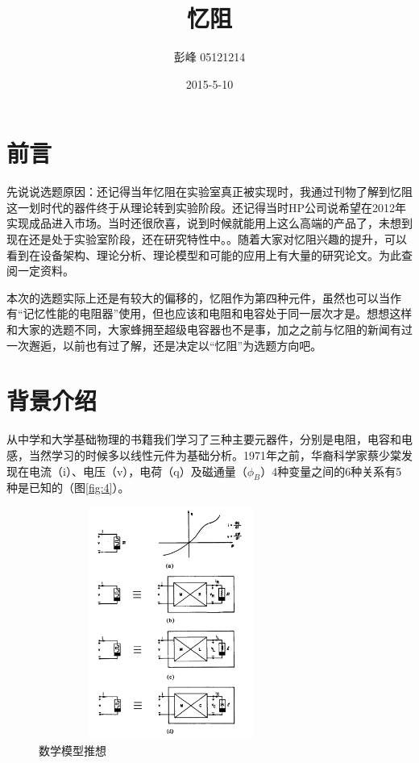 \documentclass[UTF8]{article}
\begin{document}
 
\author{    彭峰     05121214   }
 \date{2015-5-10}
\title{忆阻}  %
\titlelabel{\S\thetitle\quad}
\maketitle%

\section{前言}
先说说选题原因：还记得当年忆阻在实验室真正被实现时，我通过刊物了解到忆阻这一划时代的器件终于从理论转到实验阶段。还记得当时HP公司说希望在2012年实现成品进入市场。当时还很欣喜，说到时候就能用上这么高端的产品了，未想到现在还是处于实验室阶段，还在研究特性中。。随着大家对忆阻兴趣的提升，可以看到在设备架构、理论分析、理论模型和可能的应用上有大量的研究论文\cite{mem10}。为此查阅一定资料。

本次的选题实际上还是有较大的偏移的，忆阻作为第四种元件，虽然也可以当作有“记忆性能的电阻器”使用，但也应该和电阻和电容处于同一层次才是。想想这样和大家的选题不同，大家蜂拥至超级电容器也不是事，加之之前与忆阻的新闻有过一次邂逅，以前也有过了解，还是决定以“忆阻”为选题方向吧。

\section{背景介绍}
从中学和大学基础物理的书籍我们学习了三种主要元器件，分别是电阻，电容和电感，当然学习的时候多以线性元件为基础分析。1971年之前，华裔科学家蔡少棠发现在电流（i）、电压（v），电荷（q）及磁通量（$\phi_{B}$）4种变量之间的6种关系有5种是已知的（图\eqref{fig:4}）。
\begin{figure}[htbp]
\centering
\includegraphics[width=3.42in,height=3in]{pic/4}
\caption{数学模型推想}
\label{fig:4}
\end{figure}
\end{document}

